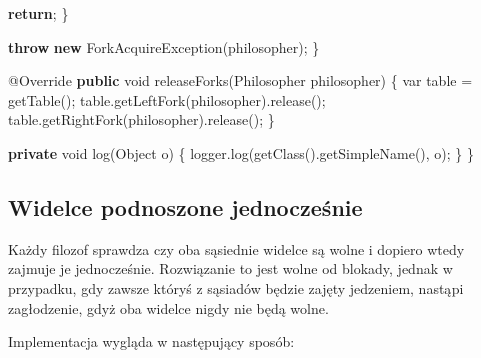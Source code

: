 \documentclass[11pt]{article}
\newenvironment{Shaded}{}{}
\newcommand{\KeywordTok}[1]{\textcolor[rgb]{0.00,0.44,0.13}{\textbf{{#1}}}}
\newcommand{\DataTypeTok}[1]{\textcolor[rgb]{0.56,0.13,0.00}{{#1}}}
\newcommand{\FunctionTok}[1]{\textcolor[rgb]{0.02,0.16,0.49}{{#1}}}
\newcommand{\NormalTok}[1]{{#1}}
\newcommand{\ControlFlowTok}[1]{\textcolor[rgb]{0.00,0.44,0.13}{\textbf{{#1}}}}
\newcommand{\OperatorTok}[1]{\textcolor[rgb]{0.40,0.40,0.40}{{#1}}}
\newcommand{\BuiltInTok}[1]{{#1}}
\newcommand{\AttributeTok}[1]{\textcolor[rgb]{0.49,0.56,0.16}{{#1}}}
\begin{document}
\begin{Shaded}
\begin{Highlighting}[]
            \ControlFlowTok{return}\OperatorTok{;}
        \OperatorTok{\}}

        \ControlFlowTok{throw} \KeywordTok{new} \FunctionTok{ForkAcquireException}\OperatorTok{(}\NormalTok{philosopher}\OperatorTok{);}
    \OperatorTok{\}}

    \AttributeTok{@Override}
    \KeywordTok{public} \DataTypeTok{void} \FunctionTok{releaseForks}\OperatorTok{(}\NormalTok{Philosopher philosopher}\OperatorTok{)} \OperatorTok{\{}
        \DataTypeTok{var}\NormalTok{ table }\OperatorTok{=} \FunctionTok{getTable}\OperatorTok{();}
\NormalTok{        table}\OperatorTok{.}\FunctionTok{getLeftFork}\OperatorTok{(}\NormalTok{philosopher}\OperatorTok{).}\FunctionTok{release}\OperatorTok{();}
\NormalTok{        table}\OperatorTok{.}\FunctionTok{getRightFork}\OperatorTok{(}\NormalTok{philosopher}\OperatorTok{).}\FunctionTok{release}\OperatorTok{();}
    \OperatorTok{\}}

    \KeywordTok{private} \DataTypeTok{void} \FunctionTok{log}\OperatorTok{(}\BuiltInTok{Object}\NormalTok{ o}\OperatorTok{)} \OperatorTok{\{}
\NormalTok{        logger}\OperatorTok{.}\FunctionTok{log}\OperatorTok{(}\FunctionTok{getClass}\OperatorTok{().}\FunctionTok{getSimpleName}\OperatorTok{(),}\NormalTok{ o}\OperatorTok{);}
    \OperatorTok{\}}
\OperatorTok{\}}
\end{Highlighting}
\end{Shaded}

    \hypertarget{widelce-podnoszone-jednoczeux15bnie}{%
\subsection{Widelce podnoszone
jednocześnie}\label{widelce-podnoszone-jednoczeux15bnie}}

Każdy filozof sprawdza czy oba sąsiednie widelce są wolne i dopiero
wtedy zajmuje je jednocześnie. Rozwiązanie to jest wolne od blokady,
jednak w przypadku, gdy zawsze któryś z sąsiadów będzie zajęty
jedzeniem, nastąpi zagłodzenie, gdyż oba widelce nigdy nie będą wolne.

Implementacja wygląda w następujący sposób:
\end{document}

